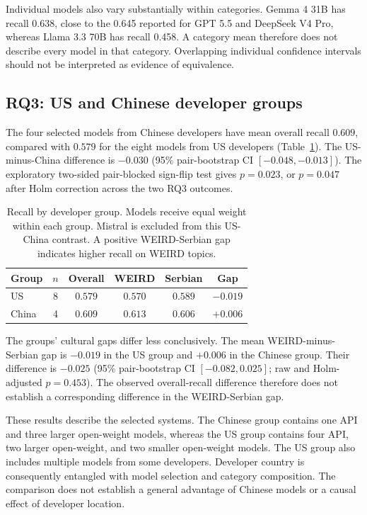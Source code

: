 \documentclass[11pt,a4paper]{article}
\begin{document}
Individual models also vary substantially within categories. Gemma 4 31B has recall 0.638, close to the 0.645 reported for GPT 5.5 and DeepSeek V4 Pro, whereas Llama 3.3 70B has recall 0.458. A category mean therefore does not describe every model in that category. Overlapping individual confidence intervals should not be interpreted as evidence of equivalence.

\subsection{RQ3: US and Chinese developer groups}
\label{sec:rq3}
The four selected models from Chinese developers have mean overall recall $0.609$, compared with $0.579$ for the eight models from US developers (Table~\ref{tab:origin-recall}). The US-minus-China difference is $-0.030$ (95\% pair-bootstrap CI $[-0.048,-0.013]$). The exploratory two-sided pair-blocked sign-flip test gives $p=0.023$, or $p=0.047$ after Holm correction across the two RQ3 outcomes.

\begin{table}[!htbp]
\centering
\small
\caption{Recall by developer group. Models receive equal weight within each group. Mistral is excluded from this US-China contrast. A positive WEIRD-Serbian gap indicates higher recall on WEIRD topics.}
\label{tab:origin-recall}
\setlength{\tabcolsep}{3pt}
\begin{tabular*}{\columnwidth}{@{\extracolsep{\fill}}lccccc@{}}
\toprule
Group & $n$ & Overall & WEIRD & Serbian & Gap\\
\midrule
US & 8 & $0.579$ & $0.570$ & $0.589$ & $-0.019$\\
China & 4 & $0.609$ & $0.613$ & $0.606$ & $+0.006$\\
\bottomrule
\end{tabular*}
\end{table}

The groups' cultural gaps differ less conclusively. The mean WEIRD-minus-Serbian gap is $-0.019$ in the US group and $+0.006$ in the Chinese group. Their difference is $-0.025$ (95\% pair-bootstrap CI $[-0.082,0.025]$; raw and Holm-adjusted $p=0.453$). The observed overall-recall difference therefore does not establish a corresponding difference in the WEIRD-Serbian gap.

These results describe the selected systems. The Chinese group contains one API and three larger open-weight models, whereas the US group contains four API, two larger open-weight, and two smaller open-weight models. The US group also includes multiple models from some developers. Developer country is consequently entangled with model selection and category composition. The comparison does not establish a general advantage of Chinese models or a causal effect of developer location.
\end{document}
